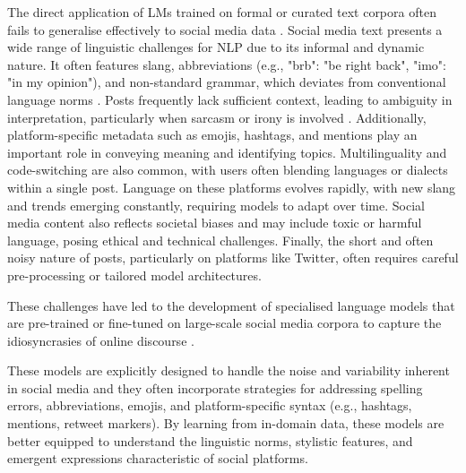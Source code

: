 The direct application of \acp{LM} trained on formal or curated text corpora often fails to generalise effectively to social media data \cite{sun-etal-2024-toward}. Social media text presents a wide range of linguistic challenges for \ac{NLP} due to its informal and dynamic nature. It often features slang, abbreviations (e.g., "brb": "be right back", "imo": "in my opinion"), and non-standard grammar, which deviates from conventional language norms \cite{bashlovkina2023smile}. Posts frequently lack sufficient context, leading to ambiguity in interpretation, particularly when sarcasm or irony is involved \cite{khan2025textual}. Additionally, platform-specific metadata such as emojis, hashtags, and mentions play an important role in conveying meaning and identifying topics. Multilinguality and code-switching are also common, with users often blending languages or dialects within a single post. Language on these platforms evolves rapidly, with new slang and trends emerging constantly, requiring models to adapt over time. Social media content also reflects societal biases and may include toxic or harmful language, posing ethical and technical challenges. Finally, the short and often noisy nature of posts, particularly on platforms like Twitter, often requires careful pre-processing or tailored model architectures. 

These challenges have led to the development of specialised language models that are pre-trained or fine-tuned on large-scale social media corpora to capture the idiosyncrasies of online discourse \cite{bertweet}.

These models are explicitly designed to handle the noise and variability inherent in social media and they often incorporate strategies for addressing spelling errors, abbreviations, emojis, and platform-specific syntax (e.g., hashtags, mentions, retweet markers). By learning from in-domain data, these models are better equipped to understand the linguistic norms, stylistic features, and emergent expressions characteristic of social platforms.


